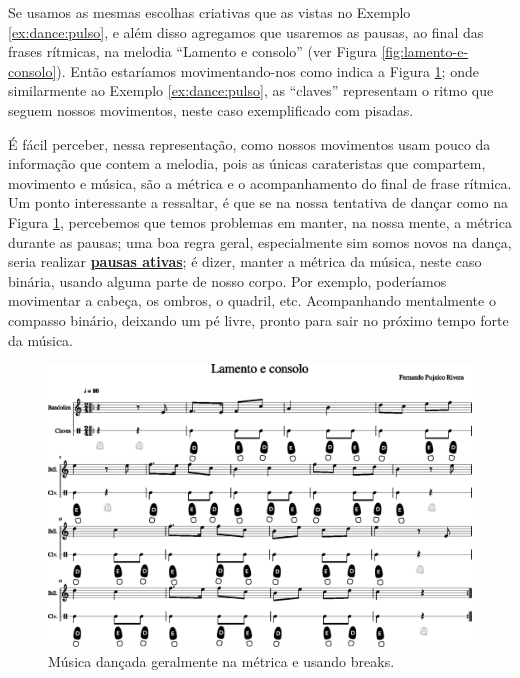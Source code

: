 \begin{example}
\label{ex:ritmo:usingbreak}
Se usamos as mesmas escolhas criativas que as vistas no Exemplo \ref{ex:dance:pulso},
e além disso agregamos que usaremos as pausas, ao final das frases rítmicas,
 na melodia ``Lamento e consolo'' (ver Figura \ref{fig:lamento-e-consolo}). 
Então estaríamos movimentando-nos como indica a Figura \ref{fig:lamentoconsolopulsobreak1};
onde similarmente ao Exemplo \ref{ex:dance:pulso},
as ``claves'' representam o ritmo que seguem nossos movimentos,
neste caso exemplificado com pisadas.

É fácil perceber, nessa representação, 
como nossos movimentos usam pouco da informação que contem a melodia, 
pois as únicas carateristas que compartem, movimento e música, 
são a métrica e o acompanhamento do final de frase rítmica.
Um ponto interessante a ressaltar,
 é que se na nossa tentativa de dançar como na Figura \ref{fig:lamentoconsolopulsobreak1}, 
percebemos que temos problemas em manter, na nossa mente, a métrica durante as pausas; 
uma boa regra geral, especialmente sim somos novos na dança, 
seria realizar \hyperref[ref:pausaativa]{\textbf{pausas ativas}};
é dizer, manter a métrica da música, neste caso binária, usando alguma parte de nosso corpo.
Por exemplo, poderíamos movimentar a cabeça, os ombros, o quadril, etc.
Acompanhando mentalmente o compasso binário,
deixando um pé livre, pronto para sair no próximo tempo forte da música.
\end{example}
\begin{figure}
    \centering
    \includegraphics[width=\textwidth]{chapters/cap-musicalidade-tecnica/lamento-e-consolo-clave-pulso+break-1.eps}
    \caption{Música dançada geralmente na métrica e usando breaks.}
    \label{fig:lamentoconsolopulsobreak1}
\end{figure}
